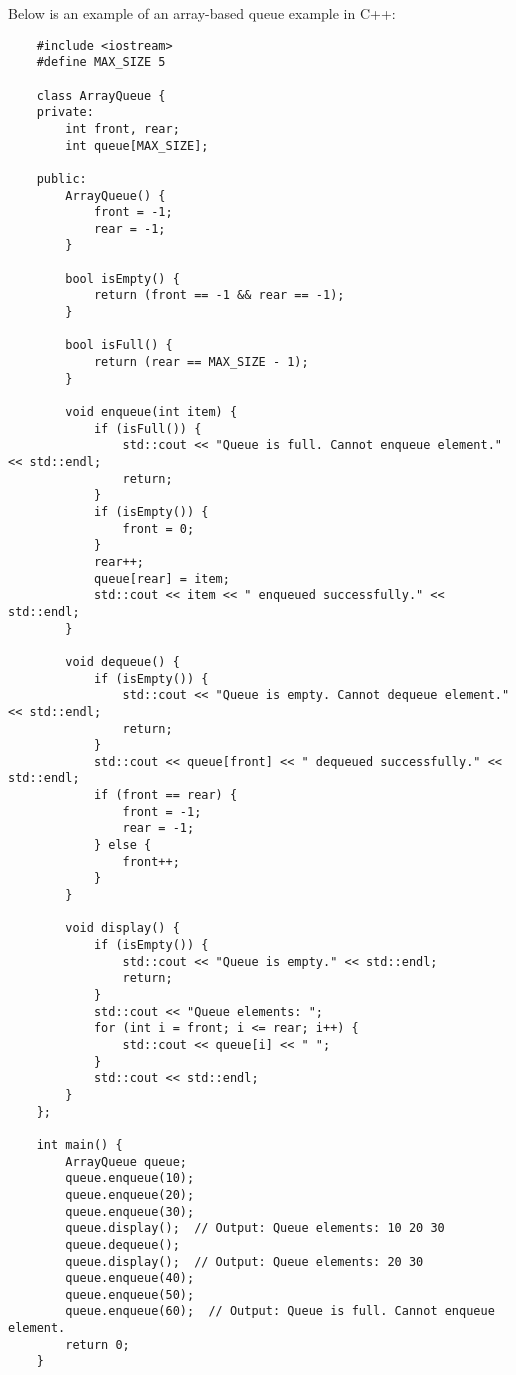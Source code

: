 \begin{solution}
    Below is an example of an array-based queue example in C++:

    \horizontalline

    \begin{verbatim}
    #include <iostream>
    #define MAX_SIZE 5
    
    class ArrayQueue {
    private:
        int front, rear;
        int queue[MAX_SIZE];
    
    public:
        ArrayQueue() {
            front = -1;
            rear = -1;
        }
    
        bool isEmpty() {
            return (front == -1 && rear == -1);
        }
    
        bool isFull() {
            return (rear == MAX_SIZE - 1);
        }
    
        void enqueue(int item) {
            if (isFull()) {
                std::cout << "Queue is full. Cannot enqueue element." << std::endl;
                return;
            }
            if (isEmpty()) {
                front = 0;
            }
            rear++;
            queue[rear] = item;
            std::cout << item << " enqueued successfully." << std::endl;
        }
    
        void dequeue() {
            if (isEmpty()) {
                std::cout << "Queue is empty. Cannot dequeue element." << std::endl;
                return;
            }
            std::cout << queue[front] << " dequeued successfully." << std::endl;
            if (front == rear) {
                front = -1;
                rear = -1;
            } else {
                front++;
            }
        }
    
        void display() {
            if (isEmpty()) {
                std::cout << "Queue is empty." << std::endl;
                return;
            }
            std::cout << "Queue elements: ";
            for (int i = front; i <= rear; i++) {
                std::cout << queue[i] << " ";
            }
            std::cout << std::endl;
        }
    };
    
    int main() {
        ArrayQueue queue;
        queue.enqueue(10);
        queue.enqueue(20);
        queue.enqueue(30);
        queue.display();  // Output: Queue elements: 10 20 30
        queue.dequeue();
        queue.display();  // Output: Queue elements: 20 30
        queue.enqueue(40);
        queue.enqueue(50);
        queue.enqueue(60);  // Output: Queue is full. Cannot enqueue element.
        return 0;
    }
    \end{verbatim}


\end{solution}
